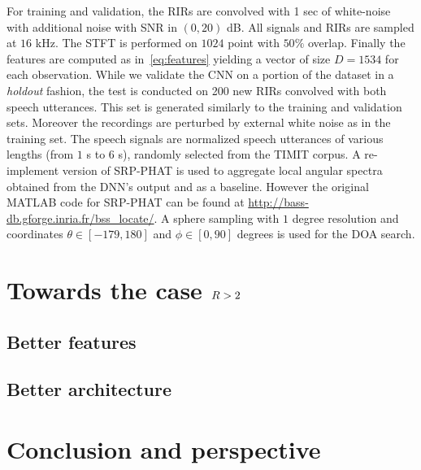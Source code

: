 For training and validation, the RIRs are convolved with 1 sec of white-noise with additional noise with SNR in $(0,20)$ dB.
All signals and RIRs are sampled at $16$ kHz. The STFT is performed on $1024$ point with $50\%$ overlap. Finally the features are computed as in~\eqref{eq:features} yielding a vector of size $D = 1534$ for each observation.
While we validate the CNN on a portion of the dataset in a \textit{holdout} fashion, the test is conducted on 200 new RIRs convolved with both speech utterances. This set is generated similarly to the training and validation sets. Moreover the recordings are perturbed by external white noise as in the training set. The speech signals are normalized speech utterances of various lengths (from $1$ s to $6$ s), randomly selected from the TIMIT corpus.
A re-implement version of SRP-PHAT is used to aggregate local angular spectra obtained from the DNN's output and as a baseline. However the original MATLAB code for SRP-PHAT can be found at \url{http://bass-db.gforge.inria.fr/bss_locate/}. A sphere sampling with $1$ degree resolution and coordinates $\theta \in [-179, 180]$ and $\phi \in [0, 90]$ degrees is used for the DOA search.


\section{Towards the case $R > 2$}

\subsection{Better features}

\subsection{Better architecture}


\section{Conclusion and perspective}